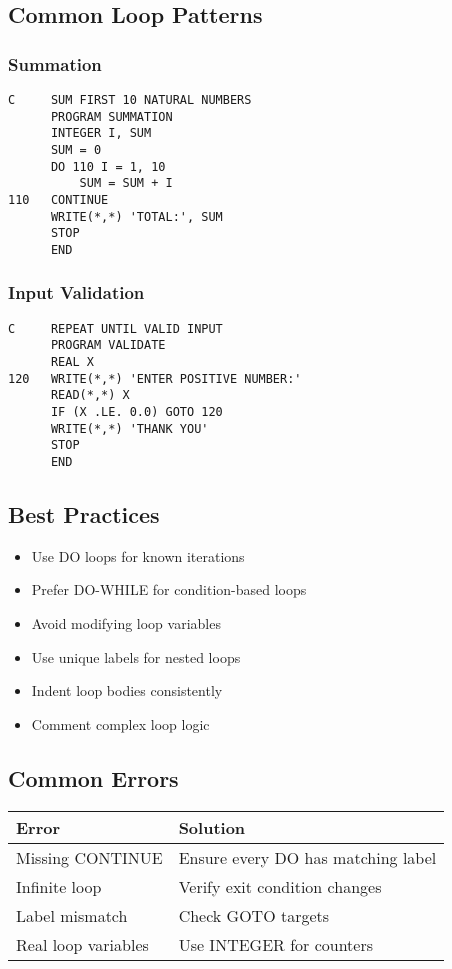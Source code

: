 \documentclass{book}
\begin{document}
\subsection*{Common Loop Patterns}

\subsubsection*{Summation}
\begin{verbatim}
C     SUM FIRST 10 NATURAL NUMBERS
      PROGRAM SUMMATION
      INTEGER I, SUM
      SUM = 0
      DO 110 I = 1, 10
          SUM = SUM + I
110   CONTINUE
      WRITE(*,*) 'TOTAL:', SUM
      STOP
      END
\end{verbatim}

\subsubsection*{Input Validation}
\begin{verbatim}
C     REPEAT UNTIL VALID INPUT
      PROGRAM VALIDATE
      REAL X
120   WRITE(*,*) 'ENTER POSITIVE NUMBER:'
      READ(*,*) X
      IF (X .LE. 0.0) GOTO 120
      WRITE(*,*) 'THANK YOU'
      STOP
      END
\end{verbatim}

\subsection*{Best Practices}
\begin{itemize}
\item Use DO loops for known iterations
\item Prefer DO-WHILE for condition-based loops
\item Avoid modifying loop variables
\item Use unique labels for nested loops
\item Indent loop bodies consistently
\item Comment complex loop logic
\end{itemize}

\subsection*{Common Errors}
\begin{center}
\begin{tabular}{|p{4cm}|p{8cm}|}
\hline
\textbf{Error} & \textbf{Solution} \\ 
\hline
Missing CONTINUE & Ensure every DO has matching label \\
\hline
Infinite loop & Verify exit condition changes \\
\hline
Label mismatch & Check GOTO targets \\
\hline
Real loop variables & Use INTEGER for counters \\
\hline
\end{tabular}
\end{center}
\end{document}
